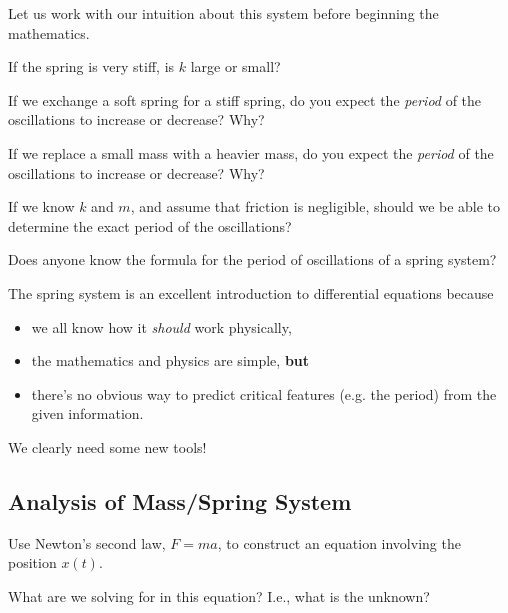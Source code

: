 \documentclass[12pt]{amsart}
\begin{document}
\newpage
Let us work with our intuition about this system before beginning the mathematics.

\begin{problem}
 If the spring is very stiff, is $k$ large or small?
\end{problem}
\vfill

 If we exchange a soft spring for a stiff spring, do you
  expect the \emph{period} of the oscillations to increase or
  decrease? Why?
\vfill


\newpage
\begin{problem}
 If we replace a small mass with a heavier mass, do you expect
the \emph{period} of the oscillations to increase or decrease? Why?
\end{problem}

\vfill

 If we know $k$ and $m$, and assume that friction is
  negligible, should we be able to determine the exact period of the
  oscillations?
\vfill

 Does anyone know the formula for the period of oscillations of a spring system?
\vfill

\newpage

The spring system is an excellent introduction to differential equations because 
\begin{itemize}
\item we all know how it \emph{should} work physically, \\[1ex]
\item the mathematics and physics are simple, {\bf but} \\[1ex]
\item there's no obvious way to predict critical features (e.g. the
  period) from the given information. \\[1ex]
\end{itemize}
We clearly need some new tools!

\newpage
{}
\subsection*{Analysis of Mass/Spring System}
\begin{problem}
 Use Newton's second law, $F = ma$, to construct an
  equation involving the position $x(t)$.
\end{problem}
\vfill

 What are we solving for in this equation?  I.e., what is
  the unknown?
\vfill
\end{document}

